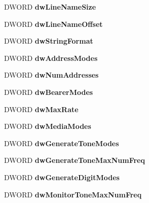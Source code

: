 \begin{DoxyCompactItemize}
D\+W\+O\+RD {\bfseries dw\+Line\+Name\+Size}
\item 
\mbox{\label{structlinedevcaps__tag_a4a448bb9819d38351fb7b4f4cb0a683c}} 
D\+W\+O\+RD {\bfseries dw\+Line\+Name\+Offset}
\item 
\mbox{\label{structlinedevcaps__tag_ab309a84b79df2ba841b6ad7c21f24339}} 
D\+W\+O\+RD {\bfseries dw\+String\+Format}
\item 
\mbox{\label{structlinedevcaps__tag_ab30664f618c00db788c75a70f3e8bc16}} 
D\+W\+O\+RD {\bfseries dw\+Address\+Modes}
\item 
\mbox{\label{structlinedevcaps__tag_a32c162cdbec0f9e17446c33f8b062d3f}} 
D\+W\+O\+RD {\bfseries dw\+Num\+Addresses}
\item 
\mbox{\label{structlinedevcaps__tag_a3896d12eaf751f2d0987d7ea4b4c224b}} 
D\+W\+O\+RD {\bfseries dw\+Bearer\+Modes}
\item 
\mbox{\label{structlinedevcaps__tag_aa01885f4f21f3f80ae6a7f02c87e3450}} 
D\+W\+O\+RD {\bfseries dw\+Max\+Rate}
\item 
\mbox{\label{structlinedevcaps__tag_adfccd564d6808532a962f4ea2763b3d1}} 
D\+W\+O\+RD {\bfseries dw\+Media\+Modes}
\item 
\mbox{\label{structlinedevcaps__tag_a2f20d124e67a857243701f2634473aa1}} 
D\+W\+O\+RD {\bfseries dw\+Generate\+Tone\+Modes}
\item 
\mbox{\label{structlinedevcaps__tag_a6f4c77fdd330589dfb5a334d80b202c3}} 
D\+W\+O\+RD {\bfseries dw\+Generate\+Tone\+Max\+Num\+Freq}
\item 
\mbox{\label{structlinedevcaps__tag_a802710b86fc234753acac4365963ef83}} 
D\+W\+O\+RD {\bfseries dw\+Generate\+Digit\+Modes}
\item 
\mbox{\label{structlinedevcaps__tag_aeed4d78f8dbef2a26051668957048017}} 
D\+W\+O\+RD {\bfseries dw\+Monitor\+Tone\+Max\+Num\+Freq}

\end{DoxyCompactItemize}
